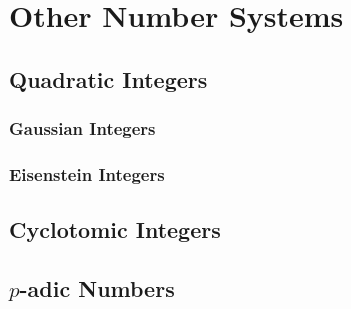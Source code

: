 \section{Other Number Systems}

\subsection{Quadratic Integers}


\subsubsection{Gaussian Integers}

\subsubsection{Eisenstein Integers}

\subsection{Cyclotomic Integers}


\subsection{$p$-adic Numbers}

